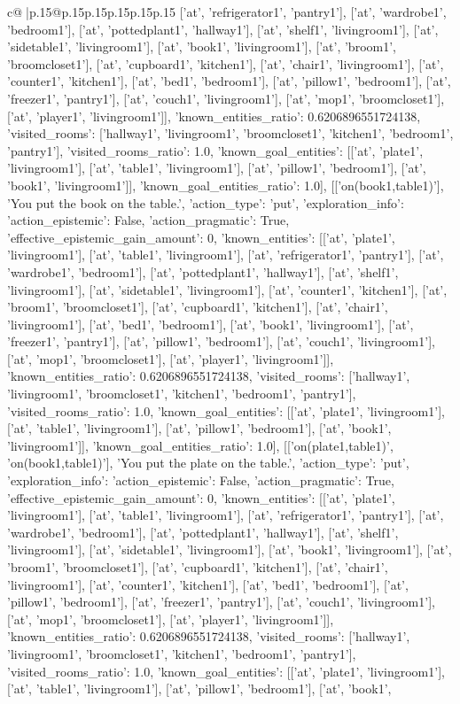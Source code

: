 \documentclass{article}
\begin{document}
{\begin{supertabular}{c@{$\;$}|p{.15\linewidth}@{}p{.15\linewidth}p{.15\linewidth}p{.15\linewidth}p{.15\linewidth}p{.15\linewidth}}
{{{['at', 'refrigerator1', 'pantry1'], ['at', 'wardrobe1', 'bedroom1'], ['at', 'pottedplant1', 'hallway1'], ['at', 'shelf1', 'livingroom1'], ['at', 'sidetable1', 'livingroom1'], ['at', 'book1', 'livingroom1'], ['at', 'broom1', 'broomcloset1'], ['at', 'cupboard1', 'kitchen1'], ['at', 'chair1', 'livingroom1'], ['at', 'counter1', 'kitchen1'], ['at', 'bed1', 'bedroom1'], ['at', 'pillow1', 'bedroom1'], ['at', 'freezer1', 'pantry1'], ['at', 'couch1', 'livingroom1'], ['at', 'mop1', 'broomcloset1'], ['at', 'player1', 'livingroom1']], 'known_entities_ratio': 0.6206896551724138, 'visited_rooms': ['hallway1', 'livingroom1', 'broomcloset1', 'kitchen1', 'bedroom1', 'pantry1'], 'visited_rooms_ratio': 1.0, 'known_goal_entities': [['at', 'plate1', 'livingroom1'], ['at', 'table1', 'livingroom1'], ['at', 'pillow1', 'bedroom1'], ['at', 'book1', 'livingroom1']], 'known_goal_entities_ratio': 1.0}}], [['on(book1,table1)'], 'You put the book on the table.', {'action_type': 'put', 'exploration_info': {'action_epistemic': False, 'action_pragmatic': True, 'effective_epistemic_gain_amount': 0, 'known_entities': [['at', 'plate1', 'livingroom1'], ['at', 'table1', 'livingroom1'], ['at', 'refrigerator1', 'pantry1'], ['at', 'wardrobe1', 'bedroom1'], ['at', 'pottedplant1', 'hallway1'], ['at', 'shelf1', 'livingroom1'], ['at', 'sidetable1', 'livingroom1'], ['at', 'counter1', 'kitchen1'], ['at', 'broom1', 'broomcloset1'], ['at', 'cupboard1', 'kitchen1'], ['at', 'chair1', 'livingroom1'], ['at', 'bed1', 'bedroom1'], ['at', 'book1', 'livingroom1'], ['at', 'freezer1', 'pantry1'], ['at', 'pillow1', 'bedroom1'], ['at', 'couch1', 'livingroom1'], ['at', 'mop1', 'broomcloset1'], ['at', 'player1', 'livingroom1']], 'known_entities_ratio': 0.6206896551724138, 'visited_rooms': ['hallway1', 'livingroom1', 'broomcloset1', 'kitchen1', 'bedroom1', 'pantry1'], 'visited_rooms_ratio': 1.0, 'known_goal_entities': [['at', 'plate1', 'livingroom1'], ['at', 'table1', 'livingroom1'], ['at', 'pillow1', 'bedroom1'], ['at', 'book1', 'livingroom1']], 'known_goal_entities_ratio': 1.0}}], [['on(plate1,table1)', 'on(book1,table1)'], 'You put the plate on the table.', {'action_type': 'put', 'exploration_info': {'action_epistemic': False, 'action_pragmatic': True, 'effective_epistemic_gain_amount': 0, 'known_entities': [['at', 'plate1', 'livingroom1'], ['at', 'table1', 'livingroom1'], ['at', 'refrigerator1', 'pantry1'], ['at', 'wardrobe1', 'bedroom1'], ['at', 'pottedplant1', 'hallway1'], ['at', 'shelf1', 'livingroom1'], ['at', 'sidetable1', 'livingroom1'], ['at', 'book1', 'livingroom1'], ['at', 'broom1', 'broomcloset1'], ['at', 'cupboard1', 'kitchen1'], ['at', 'chair1', 'livingroom1'], ['at', 'counter1', 'kitchen1'], ['at', 'bed1', 'bedroom1'], ['at', 'pillow1', 'bedroom1'], ['at', 'freezer1', 'pantry1'], ['at', 'couch1', 'livingroom1'], ['at', 'mop1', 'broomcloset1'], ['at', 'player1', 'livingroom1']], 'known_entities_ratio': 0.6206896551724138, 'visited_rooms': ['hallway1', 'livingroom1', 'broomcloset1', 'kitchen1', 'bedroom1', 'pantry1'], 'visited_rooms_ratio': 1.0, 'known_goal_entities': [['at', 'plate1', 'livingroom1'], ['at', 'table1', 'livingroom1'], ['at', 'pillow1', 'bedroom1'], ['at', 'book1', }}}
\end{supertabular}}
\end{document}
